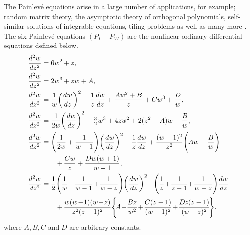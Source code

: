 \documentclass[12pt]{article}
\def\P{Painlev\'e }
\numberwithin{figure}{section}
\numberwithin{equation}{section}
\numberwithin{table}{section}
\begin{document}
The \P equations arise in a large number of applications, for example; random matrix theory, the asymptotic theory of orthogonal polynomials,
self-similar solutions of integrable equations, tiling problems as well as many more \cite{P:1303.0773}.
The six Painlev\'{e} equations $(P_I - P_{VI})$ are the nonlinear ordinary differential equations defined below.
\begin{subequations}
\begin{align}
\!\frac{d^2w}{dz^2}&= 6w^2 + z,\label{PI}\\
\!\frac{d^2w}{dz^2}&= 2w^3 + zw + A,\label{PII}\\
\!\frac{d^2w}{dz^2}&=\frac{1}{w}\bigg(\frac{dw}{dz}\bigg)^2-\frac{1}{z}\frac{dw}{dz}+ \frac{{A}w^2 + B}{z}+{C}w^3 + \frac{D}{w},\label{PIII}\\
\!\frac{d^2w}{dz^2}&= \frac{1}{2w}\bigg(\frac{dw}{dz}\bigg)^2+\tfrac{3}{2}{w^3}+ 4zw^2+ 2(z^2-A)w+ \frac{B}{w},\label{PIV}\\
\!\frac{d^2w}{dz^2}&=\Bigg{(}\frac{1}{2w}+\frac{1}{w-1}\Bigg{)}\bigg(\frac{dw}{dz}\bigg)^2-\frac{1}{z}\frac{dw}{dz}+\frac{(w-1)^2}{z^2}\Bigg{(}{A}w+\frac{B}{w}\Bigg{)}\nonumber\\
&\qquad+\frac{{C}w}{z}+\frac{{D}w(w+1)}{w-1},\label{PV}\\
\!\frac{d^2w}{dz^2}&=\frac{1}{2}\Bigg{(}\frac{1}{w}\!+\!\frac{1}{w-1}\!+\!\frac{1}{w-z}\Bigg{)}{\bigg(\frac{dw}{dz}\bigg)^2}\!-\!\Bigg{(}\frac{1}{z}\!+\!\frac{1}{z-1}\!+\!\frac{1}{w-z}\Bigg{)}\frac{dw}{dz}\nonumber\\
&\qquad+\frac{w(w\!-\!1)(w\!-\!z)}{z^2(z-1)^2}\Bigg{\{}\!A\!+\!\frac{{B}z}{w^2}\!+\!\frac{{C}(z-1)}{(w-1)^2}\!+\!\frac{{D}z(z-1)}{(w-z)^2}\!\Bigg{\}}\label{PVI}.
\end{align}
\end{subequations}
where $A,B,C$ and $D$ are arbitrary constants.
\end{document}
